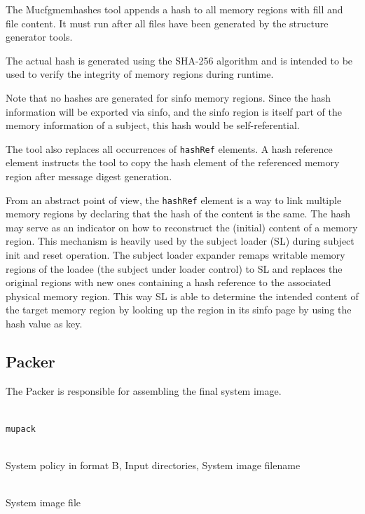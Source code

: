 \documentclass[a4paper,twoside,titlepage]{article}
\begin{document}
The Mucfgmemhashes tool appends a hash to all memory regions with fill and file
content. It must run after all files have been generated by the structure
generator tools.

The actual hash is generated using the SHA-256 algorithm and is intended to be
used to verify the integrity of memory regions during runtime.

Note that no hashes are generated for sinfo memory regions. Since the
hash information will be exported via sinfo, and the sinfo region is
itself part of the memory information of a subject, this hash would be
self-referential.

The tool also replaces all occurrences of \texttt{hashRef} elements. A hash
reference element instructs the tool to copy the hash element of the referenced
memory region after message digest generation.

From an abstract point of view, the \texttt{hashRef} element is a way to link
multiple memory regions by declaring that the hash of the content is the same.
The hash may serve as an indicator on how to reconstruct the (initial) content
of a memory region. This mechanism is heavily used by the subject loader (SL)
during subject init and reset operation. The subject loader expander remaps
writable memory regions of the loadee (the subject under loader control) to SL
and replaces the original regions with new ones containing a hash reference to
the associated physical memory region. This way SL is able to determine the
intended content of the target memory region by looking up the region in its
sinfo page by using the hash value as key.

\subsection{Packer}
\label{sec:tools-packer}
The Packer is responsible for assembling the final system image.

\begin{description} \itemsep1pt \parskip0pt
	\item[Name] \hfill \\
		\texttt{mupack}
	\item[Input] \hfill \\
		System policy in format B, Input directories, System image filename
	\item[Output] \hfill \\
		System image file
\end{description}
\end{document}
